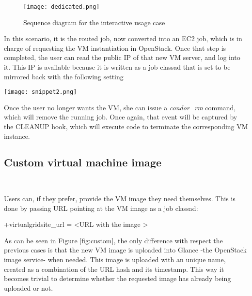 \documentclass[a4paper]{jpconf}
\begin{document}
\begin{figure}[h]
    \centering
    \texttt{[image: dedicated.png]}
    \caption{Sequence diagram for the interactive usage case}
    \label{fig:interactive}
\end{figure}

In this scenario, it is the routed job, now converted into an EC2 job, 
which is in charge of requesting the VM instantiation in OpenStack.
Once that step is completed, the user can read the public IP of that new VM server, and log into it. 
This IP is available because it is written as a job classad that is set to be
mirrored back with the following setting

\begin{snippet}[h]
    \centering
    \renewcommand\figurename{Snippet}
    \texttt{[image: snippet2.png]}
    \caption{Setup for classads to be transferred}
    \label{snip:snippet2}
\end{snippet}


Once the user no longer wants the VM, she can issue a \textit{condor\_rm}
command, which will remove the running job. 
Once again, that event will be captured by the CLEANUP hook, which will execute
code to terminate the corresponding VM instance.


\subsection{Custom virtual machine image}

~

Users can, if they prefer, provide the VM image they need themselves. 
This is done by passing URL pointing at the VM image as a job classad:
\begin{center}
    +virtualgridsite\_url = \textless URL with the image \textgreater
\end{center}

As can be seen in Figure \ref{fig:custom}, 
the only difference with respect the previous cases is that the new VM image is uploaded into Glance -the OpenStack image service- when needed.
This image is uploaded with an unique name, 
created as a combination of the URL hash and its timestamp. 
This way it becomes trivial to determine whether the requested image has already being uploaded or not. 
\end{document}
